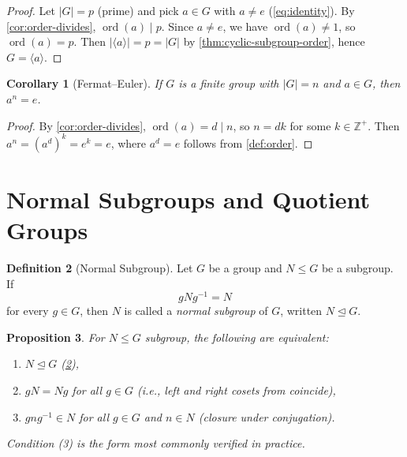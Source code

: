 \documentclass[12pt,a4paper]{article}
\theoremstyle{definition}
\newtheorem{definition}{Definition}[section]
\theoremstyle{plain}
\newtheorem{proposition}[definition]{Proposition}
\newtheorem{corollary}[definition]{Corollary}
\theoremstyle{remark}
\newcommand{\Z}{\mathbb{Z}}
\newcommand{\ord}{\operatorname{ord}}
\newcommand{\normal}{\trianglelefteq}
\begin{document}
\begin{proof}
Let $|G| = p$ (prime) and pick $a \in G$ with $a \neq e$ (\cref{eq:identity}).
By \cref{cor:order-divides}, $\ord(a) \mid p$. Since $a \neq e$, we have
$\ord(a) \neq 1$, so $\ord(a) = p$.
Then $|\langle a \rangle| = p = |G|$ by \cref{thm:cyclic-subgroup-order},
hence $G = \langle a \rangle$.
\end{proof}

\begin{corollary}[Fermat--Euler]\label{cor:fermat-euler}
If $G$ is a finite group with $|G| = n$ and $a \in G$, then $a^n = e$.
\end{corollary}

\begin{proof}
By \cref{cor:order-divides}, $\ord(a) = d \mid n$, so $n = dk$ for some
$k \in \Z^+$. Then $a^n = (a^d)^k = e^k = e$, where $a^d = e$ follows from
\cref{def:order}.
\end{proof}


\section{Normal Subgroups and Quotient Groups}\label{sec:normal}

\begin{definition}[Normal Subgroup]\label{def:normal}
Let $G$ be a group and $N \leq G$ be a subgroup. If
\begin{equation}\label{eq:normal}
    gNg^{-1} = N
\end{equation}
for every $g \in G$, then $N$ is called a \emph{normal subgroup} of $G$,
written $N \normal G$.
\end{definition}

\begin{proposition}\label{prop:normal-equiv}
For $N \leq G$ subgroup, the following are equivalent:
\begin{enumerate}
    \item $N \normal G$ (\cref{def:normal}),
    \item $gN = Ng$ for all $g \in G$
          (i.e., left and right cosets from coincide),
    \item $gng^{-1} \in N$ for all $g \in G$ and $n \in N$
          (closure under conjugation).
\end{enumerate}
Condition (3) is the form most commonly verified in practice.
\end{proposition}
\end{document}
